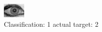 \begin{figure}[h!]
\begin{center}
\includegraphics[width=0.60\columnwidth]{figures/ID2026_class_1_target_2.png}
\end{center}
\caption{ Classification: 1 actual target: 2}
\label{fig:ID2026_class_1_target_2}
\end{figure}
